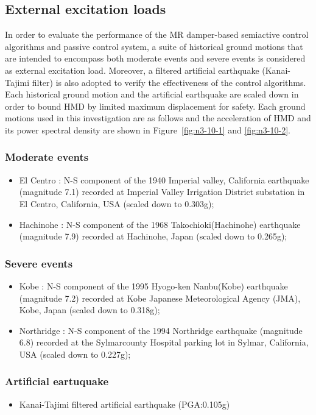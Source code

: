 \subsection{External excitation loads}
In order to evaluate the performance of the MR damper-based semiactive control algorithms and passive control system, a suite of historical ground motions that are intended to encompass both moderate events and severe events is considered as external excitation load. Moreover, a filtered artificial earthquake (Kanai-Tajimi filter) is also adopted to verify the effectiveness of the control algorithms. Each historical ground motion and the artificial earthquake are scaled down in order to bound HMD by limited maximum displacement for safety. Each ground motions used in this investigation are as follows and the acceleration of HMD and its power spectral density are shown in Figure~\ref{fig:n3-10-1} and \ref{fig:n3-10-2}.

\subsubsection{Moderate events}
\begin{itemize}
\item El Centro : N-S component of the 1940 Imperial valley, California earthquake (magnitude 7.1) recorded at Imperial Valley Irrigation District substation in El Centro, California, USA (scaled down to 0.303g);
\item Hachinohe : N-S component of the 1968 Takochioki(Hachinohe) earthquake (magnitude 7.9) recorded at Hachinohe, Japan (scaled down to 0.265g);
\end{itemize}

\subsubsection{Severe events}
\begin{itemize}
   \item Kobe : N-S component of the 1995 Hyogo-ken Nanbu(Kobe) earthquake (magnitude 7.2) recorded at Kobe Japanese Meteorological Agency (JMA), Kobe, Japan (scaled down to 0.318g);

   \item  Northridge : N-S component of the 1994 Northridge earthquake (magnitude 6.8) recorded at the Sylmarcounty Hospital parking lot in Sylmar, California, USA (scaled down to 0.227g);
\end{itemize}

\subsubsection{Artificial eartuquake}
\begin{itemize}
   \item  Kanai-Tajimi filtered artificial earthquake (PGA:0.105g)
\end{itemize}

